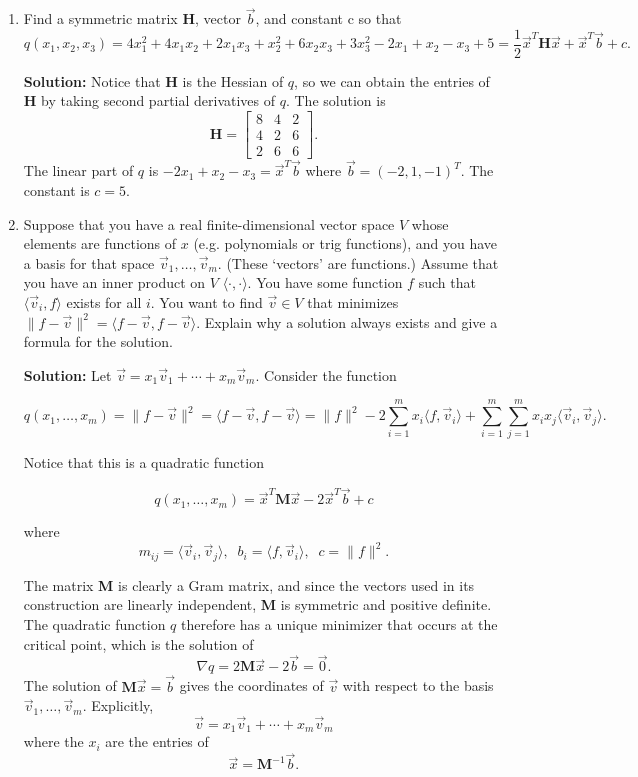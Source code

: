 \documentclass[11pt,fleqn]{article}
\begin{document}
\begin{enumerate}
\item Find a symmetric matrix $\mathbf{H}$, vector $\vec{b}$, and constant c so that
\[q(x_1,x_2,x_3) = 4x_1^2+4x_1x_2 + 2x_1x_3 + x_2^2+6x_2x_3 + 3x_3^2 -2x_1+x_2-x_3+5 = \frac{1}{2}\vec{x}^T\mathbf{H}\vec{x} + \vec{x}^T\vec{b} + c.\]

{\bf Solution:} Notice that $\mathbf{H}$ is the Hessian of $q$, so we can obtain the entries of $\mathbf{H}$ by taking second partial derivatives of $q$.
The solution is
\begin{equation}
\mathbf{H} = \left[\begin{array}{ccc}8&4&2\\4&2&6\\2&6&6\end{array}\right].
\end{equation}
The linear part of $q$ is $ -2x_1+x_2-x_3 = \vec{x}^T\vec{b}$ where $\vec{b} = (-2,1,-1)^T$. The constant is $c=5$.


\item Suppose that you have a real finite-dimensional vector space $V$ whose elements are functions of $x$ (e.g. polynomials or trig functions), and you have a basis for that space $\vec{v}_1,\ldots,\vec{v}_m$. (These `vectors' are functions.) Assume that you have an inner product on $V$ $\langle\cdot,\cdot\rangle$. You have some function $f$ such that $\langle\vec{v}_i,f\rangle$ exists for all $i$. You want to find $\vec{v}\in V$ that minimizes $\|f-\vec{v}\|^2 = \langle f-\vec{v},f-\vec{v}\rangle$. Explain why a solution always exists and give a formula for the solution.

{\bf Solution:} Let $\vec{v} = x_1\vec{v}_1 + \cdots+x_m\vec{v}_m$.
Consider the function

\[q(x_1,\ldots,x_m) = \|f-\vec{v}\|^2 = \langle f-\vec{v},f-\vec{v}\rangle=\|f\|^2 -2\sum_{i=1}^mx_i\langle f,\vec{v}_i\rangle + \sum_{i=1}^m\sum_{j=1}^mx_ix_j\langle\vec{v}_i,\vec{v}_j\rangle.\]

Notice that this is a quadratic function

\[q(x_1,\ldots,x_m) =\vec{x}^T\mathbf{M}\vec{x} -2\vec{x}^T\vec{b} + c\]

where
\[m_{ij} = \langle\vec{v}_i,\vec{v}_j\rangle,\;\; b_i = \langle f,\vec{v}_i\rangle,\;\;c = \|f\|^2.\]

The matrix {\bf M} is clearly a Gram matrix, and since the vectors used in its construction are linearly independent, {\bf M} is symmetric and positive definite.
The quadratic function $q$ therefore has a unique minimizer that occurs at the critical point, which is the solution of
\[\nabla q = 2\mathbf{M}\vec{x} -2\vec{b} = \vec{0}.\]
The solution of $\mathbf{M}\vec{x} = \vec{b}$ gives the coordinates of $\vec{v}$ with respect to the basis $\vec{v}_1,\ldots,\vec{v}_m$.
Explicitly,
\[\vec{v} =  x_1\vec{v}_1 + \cdots+x_m\vec{v}_m\]
where the $x_i$ are the entries of 
\[\vec{x} = \mathbf{M}^{-1}\vec{b}.\]


\end{enumerate}
\end{document}
